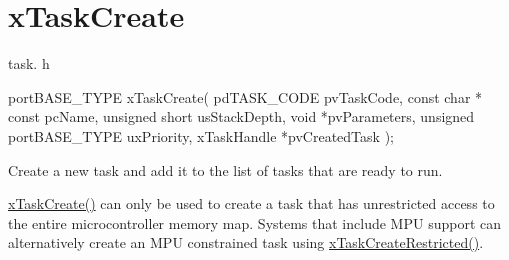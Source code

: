 \hypertarget{group__x_task_create}{\section{x\-Task\-Create}
\label{group__x_task_create}
}
task. h 
\begin{DoxyPre}
 portBASE\_TYPE xTaskCreate(
                              pdTASK\_CODE pvTaskCode,
                              const char * const pcName,
                              unsigned short usStackDepth,
                              void *pvParameters,
                              unsigned portBASE\_TYPE uxPriority,
                              xTaskHandle *pvCreatedTask
                          );\end{DoxyPre}


Create a new task and add it to the list of tasks that are ready to run.

\hyperlink{task_8h_adf67e7cd0bfd1eda9e8afd048206f7c2}{x\-Task\-Create()} can only be used to create a task that has unrestricted access to the entire microcontroller memory map. Systems that include M\-P\-U support can alternatively create an M\-P\-U constrained task using \hyperlink{task_8h_a61b00cd623953f4f94fe794057d7f648}{x\-Task\-Create\-Restricted()}.


